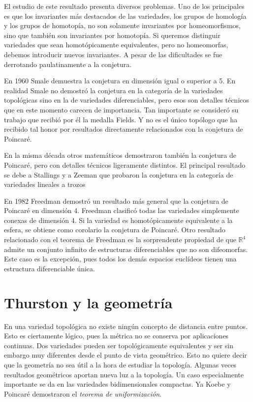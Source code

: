 \documentclass[a4paper, 12pt]{article}
\newcommand{\R}{\mathbb{R}}%
\begin{document}
El estudio de este resultado presenta diversos problemas.  Uno de los principales es que los invariantes más destacados de las variedades, los grupos de homología y los grupos de homotopía, no son solamente invariantes por homeomorfismos, sino que también son invariantes por homotopía. Si queremos distinguir variedades que sean homotópicamente equivalentes, pero no homeomorfas, debemos introducir nuevos invariantes. A pesar de las dificultades se fue derrotando paulatinamente a la conjetura. 


En 1960 Smale demuestra la conjetura  en dimensión  igual o superior a 5. En realidad Smale no demostró la conjetura en la categoría de la variedades topológicas sino en la de variedades diferenciables, pero esos son detalles técnicos que en este momento carecen de importancia. Tan importante se consideró su trabajo que recibió por él  la medalla Fields.  Y no es el único topólogo que ha recibido tal honor por resultados directamente relacionados con la conjetura de Poincaré. 

En la misma década otros matemáticos demostraron también la conjetura de Poincaré, pero con detalles técnicos ligeramente distintos.  El principal resultado se debe a Stallings y a Zeeman que probaron la conjetura en la categoría de variedades lineales a trozos




 En 1982 Freedman demostró un resultado más general que la conjetura de Poincaré en dimensión 4. Freedman clasificó todas las variedades  simplemente conexas de dimensión 4.  Si la variedad es homotópicamente equivalente a la esfera, se obtiene como  corolario  la conjetura de Poincaré.  Otro resultado relacionado con el teorema de Freedman es la sorprendente propiedad de que $\R^4$ admite un conjunto infinito de estructuras diferenciables que no son difeomorfas.  Este caso es la excepción,  pues todos los demás espacios euclídeos tienen una estructura diferenciable única.


\newpage

\section*{Thurston y la geometría}


En una variedad topológica no existe ningún concepto de distancia entre puntos. Esto es ciertamente lógico, pues la métrica no se conserva por aplicaciones continuas.  Dos variedades pueden ser topológicamente equivalentes y ser sin embargo muy diferentes desde el punto de vista geométrico.  Esto no quiere decir que la geometría no sea útil a la hora de estudiar la topología. Algunas veces resultados geométricos aportan nueva luz a la topología.  Un caso especialmente importante se da en las variedades bidimensionales compactas. Ya Koebe y Poincaré demostraron  el {\it teorema de uniformización}.
\end{document}
